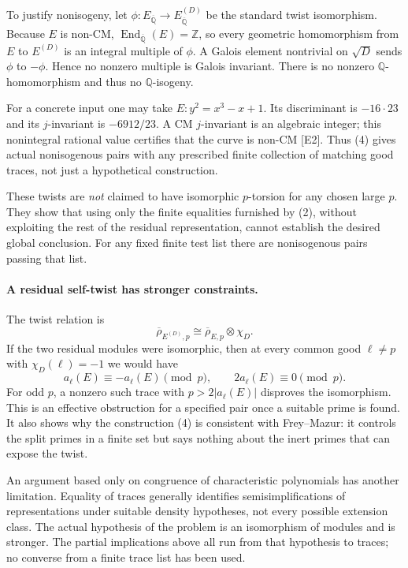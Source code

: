 \documentclass[11pt]{article}
\begin{document}
To justify nonisogeny, let $\phi:E_{\overline{\mathbb Q}}\to E^{(D)}_{\overline{\mathbb Q}}$ be the standard twist isomorphism. Because $E$ is non-CM, $\operatorname{End}_{\overline{\mathbb Q}}(E)=\mathbb Z$, so every geometric homomorphism from $E$ to $E^{(D)}$ is an integral multiple of $\phi$. A Galois element nontrivial on $\sqrt D$ sends $\phi$ to $-\phi$. Hence no nonzero multiple is Galois invariant. There is no nonzero $\mathbb Q$-homomorphism and thus no $\mathbb Q$-isogeny.

For a concrete input one may take $E:y^2=x^3-x+1$. Its discriminant is $-16\cdot23$ and its $j$-invariant is $-6912/23$. A CM $j$-invariant is an algebraic integer; this nonintegral rational value certifies that the curve is non-CM [E2]. Thus (4) gives actual nonisogenous pairs with any prescribed finite collection of matching good traces, not just a hypothetical construction.

These twists are \emph{not} claimed to have isomorphic $p$-torsion for any chosen large $p$. They show that using only the finite equalities furnished by (2), without exploiting the rest of the residual representation, cannot establish the desired global conclusion. For any fixed finite test list there are nonisogenous pairs passing that list.

\paragraph{A residual self-twist has stronger constraints.}
The twist relation is
\[
 \overline\rho_{E^{(D)},p}\cong
 \overline\rho_{E,p}\otimes\chi_D.
\]
If the two residual modules were isomorphic, then at every common good $\ell\ne p$ with $\chi_D(\ell)=-1$ we would have
\[
 a_\ell(E)\equiv-a_\ell(E)\pmod p,
 \qquad 2a_\ell(E)\equiv0\pmod p.
\]
For odd $p$, a nonzero such trace with $p>2|a_\ell(E)|$ disproves the isomorphism. This is an effective obstruction for a specified pair once a suitable prime is found. It also shows why the construction (4) is consistent with Frey--Mazur: it controls the split primes in a finite set but says nothing about the inert primes that can expose the twist.

An argument based only on congruence of characteristic polynomials has another limitation. Equality of traces generally identifies semisimplifications of representations under suitable density hypotheses, not every possible extension class. The actual hypothesis of the problem is an isomorphism of modules and is stronger. The partial implications above all run from that hypothesis to traces; no converse from a finite trace list has been used.
\end{document}
